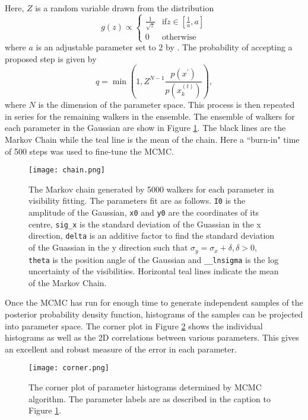 Here, $Z$ is a random variable drawn from the distribution
\begin{equation}
\label{eq:MCMC_g}
g(z) \propto 
\begin{cases}
\frac{1}{\sqrt{z}} & \mbox{if} z \in \left[\frac{1}{a}, a \right] \\
0 & \mbox{otherwise}
\end{cases}
\end{equation}
where $a$ is an adjustable parameter set to 2 by \cite{Goodman2010}. The probability of accepting a proposed step is given by
\begin{equation}
\label{eq:MCMC_stretch_newstate}
q = \min \left(1, Z^{N-1} \frac{p(x^\prime)}{p(x_k^{(t)})}\right),
\end{equation} 
where $N$ is the dimension of the parameter space. This process is then repeated in series for the remaining walkers in the ensemble.
The ensemble of walkers for each parameter in the Gaussian are show in Figure \ref{fig:MCMCchain}. The black lines are the Markov Chain while the teal line is the mean of the chain. Here a ``burn-in" time of 500 steps was used to fine-tune the MCMC. 
\begin{figure}[ht]
\centering
\texttt{[image: chain.png]}
\caption[The Markov chain generated by 5000 walkers for each parameter in visibility fitting.]{The Markov chain generated by 5000 walkers for each parameter in visibility fitting. The parameters fit are as follows. \texttt{I0} is the amplitude of the Gaussian, \texttt{x0} and \texttt{y0} are the coordinates of its centre, \texttt{sig\_x} is the standard deviation of the Guassian in the x direction, \texttt{delta} is an additive factor to find the standard deviation of the Guassian in the y direction such that $\sigma_y = \sigma_x + \delta, \delta > 0$, \texttt{theta} is the position angle of the Gaussian and \texttt{\_\_lnsigma} is the log uncertainty of the visibilities. Horizontal teal lines indicate the mean of the Markov Chain.}
\label{fig:MCMCchain}
\end{figure}

Once the MCMC has run for enough time to generate independent samples of the posterior probability density function, histograms of the samples can be projected into parameter space. The corner plot in Figure \ref{fig:MCMCcorner} shows the individual histograms as well as the 2D correlations between various parameters. This gives an excellent and robust measure of the error in each parameter.

\begin{figure}[ht]
\centering
\texttt{[image: corner.png]}
\caption[A Corner plot of parameter histograms determined by MCMC algorithm.]{The corner plot of parameter histograms determined by MCMC algorithm. The parameter labels are as described in the caption to Figure \ref{fig:MCMCchain}.}
\label{fig:MCMCcorner}
\end{figure}

